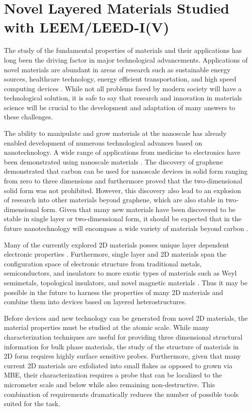 \chapter{\sc Novel Layered Materials Studied with LEEM/LEED-I(V)}
\label{ch:Novel Layered Materials Studied with LEEM/LEED-I(V)}

The study of the fundamental properties of materials and their applications has long been the driving factor in major technological advancements. Applications of novel materials are abundant in areas of research such as sustainable energy sources, healthcare technology, energy efficient transportation, and high speed computing devices \cite{novel-materials}. While not all problems faced by modern society will have a technological solution, it is safe to say that research and innovation in materials science will be crucial to the development and adaptation of many answers to these challenges.

The ability to manipulate and grow materials at the nanoscale has already enabled development of numerous technological advances based on nanotechnology. A wide range of applications from medicine to electronics have been demonstrated using nanoscale materials \cite{nanocancer, energystoragematerials}. The discovery of graphene demonstrated that carbon can be used for nanoscale devices in solid form ranging from zero to three dimensions and furthermore proved that the two-dimensional solid form was not prohibited. However, this discovery also lead to an explosion of research into other materials beyond graphene, which are also stable in two-dimensional form. Given that many new materials have been discovered to be stable in single layer or two-dimensional form, it should be expected that in the future nanotechnology will encompass a wide variety of materials beyond carbon \cite{2d-atlas}.

Many of the currently explored 2D materials posses unique layer dependent electronic properties \cite{2D-TMDs}. Furthermore, single layer and 2D materials span the configuration space of electronic structure from traditional metals, semiconductors, and insulators to more exotic types of materials such as Weyl semimetals, topological insulators, and novel magnetic materials \cite{2d-atlas}. Thus it may be possible in the future to harness the properties of many 2D materials and combine them into devices based on layered heterostructures.

Before devices and new technology can be generated from novel 2D materials, the material properties must be studied at the atomic scale. While many characterization techniques are useful for providing three dimensional structural information for bulk phase materials, the study of the structure of materials in 2D form requires highly surface sensitive probes. Furthermore, given that many current 2D materials are exfoliated into small flakes as opposed to grown via MBE, their characterization requires a probe that can be localized to the micrometer scale and below while also remaining non-destructive. This combination of requirements dramatically reduces the number of possible tools suited for the task.

